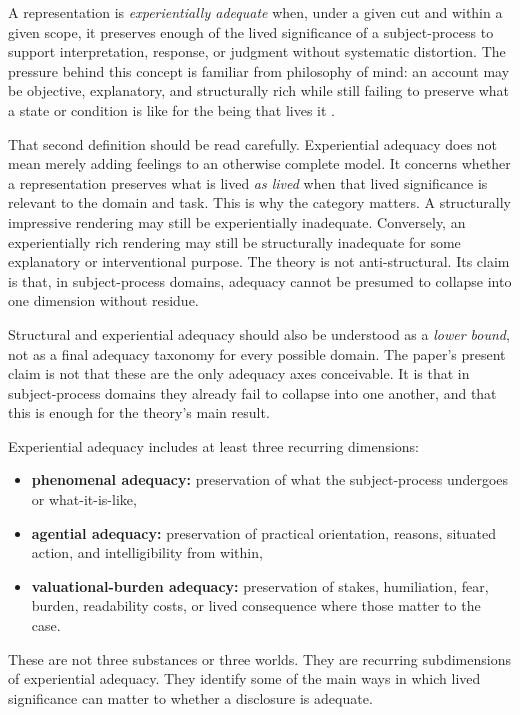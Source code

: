 \documentclass[11pt]{article}
\renewcommand{\emph}[1]{\textit{#1}}
\begin{document}
A representation is \emph{experientially adequate} when, under a given cut and within a given scope, it preserves enough of the lived significance of a subject-process to support interpretation, response, or judgment without systematic distortion. The pressure behind this concept is familiar from philosophy of mind: an account may be objective, explanatory, and structurally rich while still failing to preserve what a state or condition is like for the being that lives it \cite{Nagel1974,Levine1983,Chalmers1995}.

That second definition should be read carefully. Experiential adequacy does not mean merely adding feelings to an otherwise complete model. It concerns whether a representation preserves what is lived \emph{as lived} when that lived significance is relevant to the domain and task. This is why the category matters. A structurally impressive rendering may still be experientially inadequate. Conversely, an experientially rich rendering may still be structurally inadequate for some explanatory or interventional purpose. The theory is not anti-structural. Its claim is that, in subject-process domains, adequacy cannot be presumed to collapse into one dimension without residue.

Structural and experiential adequacy should also be understood as a \emph{lower bound}, not as a final adequacy taxonomy for every possible domain. The paper's present claim is not that these are the only adequacy axes conceivable. It is that in subject-process domains they already fail to collapse into one another, and that this is enough for the theory's main result.

Experiential adequacy includes at least three recurring dimensions:
\begin{itemize}
    \item \textbf{phenomenal adequacy:} preservation of what the subject-process undergoes or what-it-is-like,
    \item \textbf{agential adequacy:} preservation of practical orientation, reasons, situated action, and intelligibility from within,
    \item \textbf{valuational-burden adequacy:} preservation of stakes, humiliation, fear, burden, readability costs, or lived consequence where those matter to the case.
\end{itemize}

These are not three substances or three worlds. They are recurring subdimensions of experiential adequacy. They identify some of the main ways in which lived significance can matter to whether a disclosure is adequate.
\end{document}
